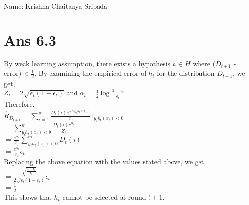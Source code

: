 \documentclass[10pt]{article}
\begin{document}
\section*{}
\begin{flushleft}
Name: Krishna Chaitanya Sripada\\
\end{flushleft}
\section*{Ans 6.3}
\begin{flushleft}
By weak learning assumption, there exists a hypothesis $h \in H$ where ($D_{t+1}$ - error) < $\frac{1}{2}$. By examining the empirical error of $h_{t}$ for the distribution $D_{t+1}$, we get, \\
\vspace{0.5em}
\hspace{2em} $Z_{t} = 2 \sqrt{\epsilon_{t}(1 - \epsilon_{t})}$ and $\alpha_{t} = \frac{1}{2} \log \frac{1 - \epsilon_{t}}{\epsilon_{t}}$\\
Therefore,\\
\vspace{0.5em}
\hspace{2em} $\hat{R}_{D_{t+1}} = \sum\limits_{i=1}^{m} \frac{D_{t}(i)e^{-\alpha_{t} y_{i} h_{t}(x_{i})}}{Z_{t}} 1_{y_{i}h_{t}(x_{i}) <0}$\\
\hspace{4.5em} $= \sum\limits_{y_{i}h_{t}(x_{i})<0}^{m} \frac{D_{t}(i) e^{\alpha_{t}}}{Z_{t}}$\\
\hspace{4.5em} $= \frac{e^{\alpha_{t}}}{Z_{t}} \sum\limits_{y_{i}h_{t}(x_{i})<0}^{m} D_{t}(i)$\\
\hspace{4.5em} $= \frac{e^{\alpha_{t}}}{Z_{t}} \epsilon_{t}$\\
Replacing the above equation with the values stated above, we get,\\
\vspace{0.5em}
\hspace{4.5em} $= \frac{\sqrt{\frac{1- \epsilon_{t}}{\epsilon_{t}}}}{2 \sqrt{\epsilon_{t}(1 - \epsilon_{t})}} \epsilon_{t}$\\
\hspace{4.5em} $= \frac{1}{2}$\\
\vspace{0.5em}
This shows that $h_{t}$ cannot be selected at round $t+1$.
\end{flushleft}
\end{document}
